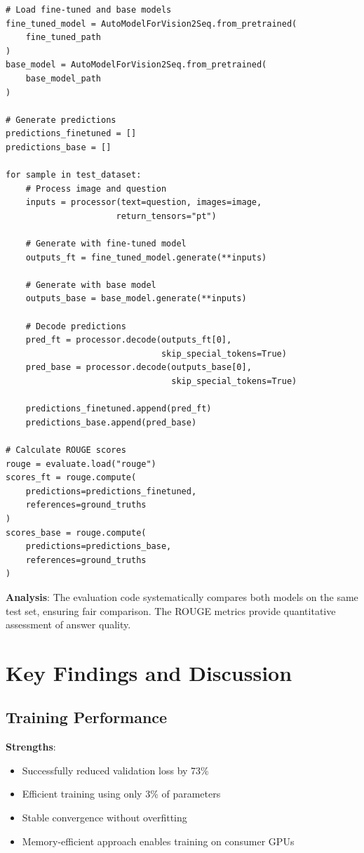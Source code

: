 \documentclass[conference]{IEEEtran}
\begin{document}
\begin{lstlisting}[caption={Evaluation Pipeline}]
# Load fine-tuned and base models
fine_tuned_model = AutoModelForVision2Seq.from_pretrained(
    fine_tuned_path
)
base_model = AutoModelForVision2Seq.from_pretrained(
    base_model_path
)

# Generate predictions
predictions_finetuned = []
predictions_base = []

for sample in test_dataset:
    # Process image and question
    inputs = processor(text=question, images=image, 
                      return_tensors="pt")
    
    # Generate with fine-tuned model
    outputs_ft = fine_tuned_model.generate(**inputs)
    
    # Generate with base model
    outputs_base = base_model.generate(**inputs)
    
    # Decode predictions
    pred_ft = processor.decode(outputs_ft[0], 
                               skip_special_tokens=True)
    pred_base = processor.decode(outputs_base[0], 
                                 skip_special_tokens=True)
    
    predictions_finetuned.append(pred_ft)
    predictions_base.append(pred_base)

# Calculate ROUGE scores
rouge = evaluate.load("rouge")
scores_ft = rouge.compute(
    predictions=predictions_finetuned,
    references=ground_truths
)
scores_base = rouge.compute(
    predictions=predictions_base,
    references=ground_truths
)
\end{lstlisting}

\textbf{Analysis}: The evaluation code systematically compares both models on the same test set, ensuring fair comparison. The ROUGE metrics provide quantitative assessment of answer quality.

\section{Key Findings and Discussion}

\subsection{Training Performance}

\textbf{Strengths}:
\begin{itemize}
    \item Successfully reduced validation loss by 73\%
    \item Efficient training using only 3\% of parameters
    \item Stable convergence without overfitting
    \item Memory-efficient approach enables training on consumer GPUs
\end{itemize}
\end{document}
